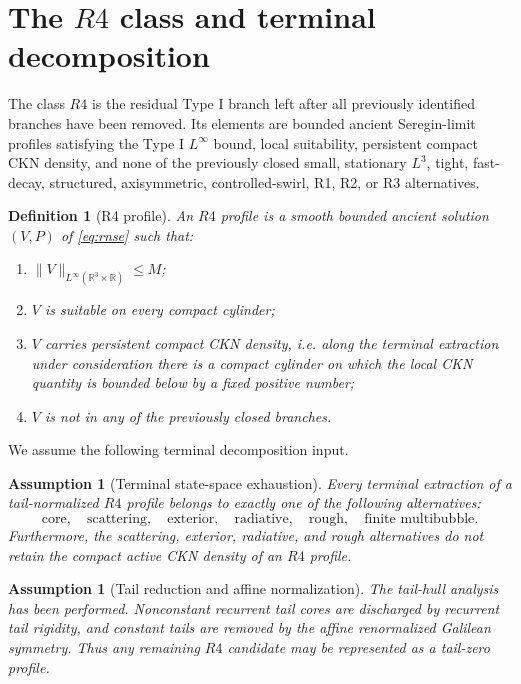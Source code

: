 \documentclass[11pt]{article}
\numberwithin{equation}{section}
\newtheorem{assumption}[theorem]{Assumption}
\newtheorem{definition}[theorem]{Definition}
\newcommand{\R}{\mathbb R}
\begin{document}
\section{The \(R4\) class and terminal decomposition}

The class \(R4\) is the residual Type I branch left after all previously
identified branches have been removed.  Its elements are bounded ancient
Seregin-limit profiles satisfying the Type I \(L^\infty\) bound, local
suitability, persistent compact CKN density, and none of the previously closed
small, stationary \(L^3\), tight, fast-decay, structured, axisymmetric,
controlled-swirl, R1, R2, or R3 alternatives.

\begin{definition}[R4 profile]
An \(R4\) profile is a smooth bounded ancient solution \((V,P)\) of
\eqref{eq:rnse} such that:
\begin{enumerate}[label=(\roman*)]
  \item \(\|V\|_{L^\infty(\R^3\times\R)}\le M\);
  \item \(V\) is suitable on every compact cylinder;
  \item \(V\) carries persistent compact CKN density, i.e. along the terminal
  extraction under consideration there is a compact cylinder on which the
  local CKN quantity is bounded below by a fixed positive number;
  \item \(V\) is not in any of the previously closed branches.
\end{enumerate}
\end{definition}

We assume the following terminal decomposition input.

\begin{assumption}[Terminal state-space exhaustion]
\label{ass:terminal-exhaustion}
Every terminal extraction of a tail-normalized \(R4\) profile belongs to exactly
one of the following alternatives:
\[
  \text{core},\quad
  \text{scattering},\quad
  \text{exterior},\quad
  \text{radiative},\quad
  \text{rough},\quad
  \text{finite multibubble}.
\]
Furthermore, the scattering, exterior, radiative, and rough alternatives do not
retain the compact active CKN density of an \(R4\) profile.
\end{assumption}

\begin{assumption}[Tail reduction and affine normalization]
\label{ass:tail-normalization}
The tail-hull analysis has been performed.  Nonconstant recurrent tail cores
are discharged by recurrent tail rigidity, and constant tails are removed by
the affine renormalized Galilean symmetry.  Thus any remaining \(R4\) candidate
may be represented as a tail-zero profile.
\end{assumption}
\end{document}
